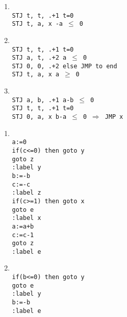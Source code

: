 \documentclass[a4paper,11pt]{article}             %
\begin{document}
\begin{enumerate}
\begin{enumerate}
\item \texttt{\\
STJ t, t, .+1 \quad t=0\\
STJ t, a, x -a $\leq$ 0
}

\item \texttt{\\
STJ t, t, .+1 \quad t=0\\
STJ a, t, .+2 \quad a $\leq$ 0\\
STJ 0, 0, .+2 \quad else JMP to end\\
STJ t, a, x \quad a $\geq$ 0 
}

\item \texttt{\\
STJ a, b, .+1 \quad a-b $\leq$ 0\\
STJ t, t, .+1 \quad t=0\\
STJ 0, a, x \quad b-a $\leq$ 0 $\Rightarrow$ JMP x
}

\end{enumerate}

\begin{enumerate}
\item \texttt{\\
a:=0\\
if(c<=0) then goto y\\
goto z\\
:label y\\
b:=-b\\
c:=-c\\
:label z\\
if(c>=1) then goto x\\
goto e\\
:label x\\
a:=a+b\\
c:=c-1\\
goto z\\
:label e
}

\item \texttt{\\
if(b<=0) then goto y\\
goto e\\
:label y\\
b:=-b\\
:label e
}


\end{enumerate}
\end{enumerate}
\end{document}
